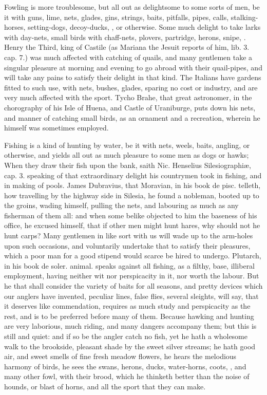 {Fowling is more troublesome, but all out as delightsome to some sorts
of men, be it with guns, lime, nets, glades, gins, strings, baits,
pitfalls, pipes, calls, stalking-horses, setting-dogs, decoy-ducks,
\etc{}, or otherwise. Some much delight to take larks with day-nets, small
birds with chaff-nets, plovers, partridge, herons, snipe, \etc{}. Henry the
Third, king of Castile (as Mariana the Jesuit reports of him, lib. 3.
cap. 7.) was much affected with catching of quails, and many
gentlemen take a singular pleasure at morning and evening to go abroad
with their quail-pipes, and will take any pains to satisfy their
delight in that kind. The Italians have gardens fitted to such
use, with nets, bushes, glades, sparing no cost or industry, and are
very much affected with the sport. Tycho Brahe, that great astronomer,
in the chorography of his Isle of Huena, and Castle of Uraniburge, puts
down his nets, and manner of catching small birds, as an ornament and a
recreation, wherein he himself was sometimes employed.

Fishing is a kind of hunting by water, be it with nets, weels, baits,
angling, or otherwise, and yields all out as much pleasure to some men
as dogs or hawks; When they draw their fish upon the bank, saith
Nic. Henselius Silesiographi\ae{}, cap. 3. speaking of that extraordinary
delight his countrymen took in fishing, and in making of pools. James
Dubravius, that Moravian, in his book de pisc. telleth, how travelling
by the highway side in Silesia, he found a nobleman, booted up to
the groins, wading himself, pulling the nets, and labouring as much as
any fisherman of them all: and when some belike objected to him the
baseness of his office, he excused himself, that if other men
might hunt hares, why should not he hunt carps? Many gentlemen in like
sort with us will wade up to the arm-holes upon such occasions, and
voluntarily undertake that to satisfy their pleasures, which a poor man
for a good stipend would scarce be hired to undergo. Plutarch, in his
book de soler. animal. speaks against all fishing, as a filthy,
base, illiberal employment, having neither wit nor perspicacity in it,
nor worth the labour. But he that shall consider the variety of baits
for all seasons, and pretty devices which our anglers have invented,
peculiar lines, false flies, several sleights, \etc{} will say, that it
deserves like commendation, requires as much study and perspicacity as
the rest, and is to be preferred before many of them. Because hawking
and hunting are very laborious, much riding, and many dangers accompany
them; but this is still and quiet: and if so be the angler catch no
fish, yet he hath a wholesome walk to the brookside, pleasant shade by
the sweet silver streams; he hath good air, and sweet smells of fine
fresh meadow flowers, he hears the melodious harmony of birds, he sees
the swans, herons, ducks, water-horns, coots, \etc{}, and many other fowl,
with their brood, which he thinketh better than the noise of hounds, or
blast of horns, and all the sport that they can make.

}
